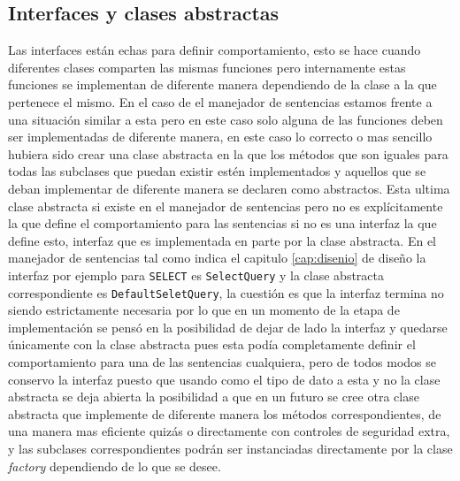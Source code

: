 \subsection{Interfaces y clases abstractas}
%
Las interfaces están echas para definir comportamiento, esto se hace cuando diferentes clases comparten las mismas funciones pero internamente estas funciones se implementan de diferente manera dependiendo de la clase a la que pertenece el mismo. En el caso de el manejador de sentencias estamos frente a una situación similar a esta pero en este caso solo alguna de las funciones deben ser implementadas de diferente manera, en este caso lo correcto o mas sencillo hubiera sido crear una clase abstracta en la que los métodos que son iguales para todas las subclases que puedan existir estén implementados y aquellos que se deban implementar de diferente manera se declaren como abstractos. Esta ultima clase abstracta si existe en el manejador de sentencias pero no es explícitamente la que define el comportamiento para las sentencias si no es una interfaz la que define esto, interfaz que es implementada en parte por la clase abstracta. En el manejador de sentencias tal como indica el capitulo \ref{cap:disenio} de diseño la interfaz por ejemplo para \verb=SELECT= es \verb=SelectQuery= y la clase abstracta correspondiente es \verb=DefaultSeletQuery=, la cuestión es que la interfaz termina no siendo estrictamente necesaria por lo que en un momento de la etapa de implementación se pensó en la posibilidad de dejar de lado la interfaz y quedarse únicamente con la clase abstracta pues esta podía completamente definir el comportamiento para una de las sentencias cualquiera, pero de todos modos se conservo la interfaz puesto que usando como el tipo de dato a esta y no la clase abstracta se deja abierta la posibilidad a que en un futuro se cree otra clase abstracta que implemente de diferente manera los métodos correspondientes, de una manera mas eficiente quizás o directamente con controles de seguridad extra, y las subclases correspondientes podrán ser instanciadas directamente por la clase \textit{factory} dependiendo de lo que se desee. 
%
